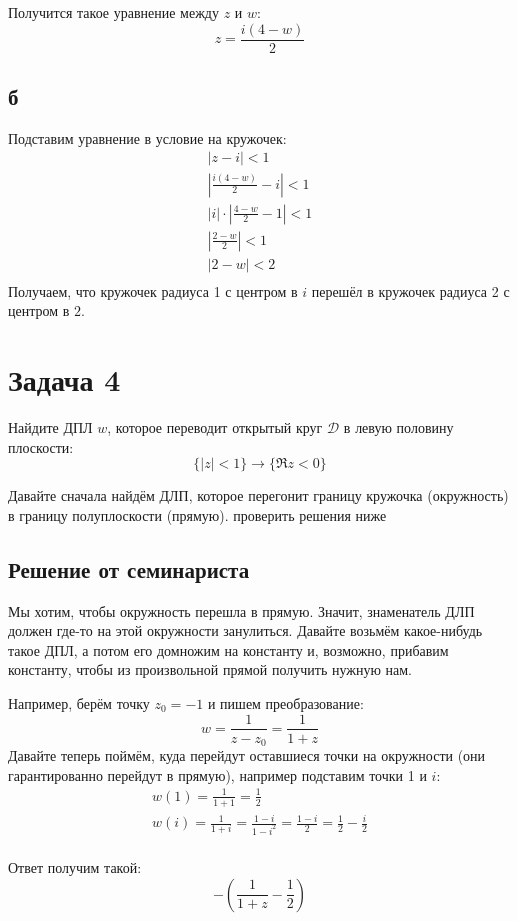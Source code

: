 		Получится такое уравнение между $z$ и $w$:
		\[
			z = \frac{i(4-w)}{2}
		\]

	\subsection{б}
		Подставим уравнение в условие на кружочек:
		\begin{gather*}
			|z - i| < 1 \\
			\left|\frac{i(4-w)}{2} - i\right| < 1\\
			|i|\cdot\left|\frac{4-w}{2} - 1\right| < 1\\
			\left|\frac{2-w}{2}\right| < 1\\
			|2-w| < 2\\
		\end{gather*}
		Получаем, что кружочек радиуса 1 с центром в $i$ перешёл в кружочек радиуса 2 с центром в $2$.

\section{Задача 4}
	Найдите ДПЛ $w$, которое переводит открытый круг $\mathcal{D}$ в левую половину плоскости:
	\[
		\{ |z| < 1 \} \to \{ \Re z < 0 \}
	\]

	Давайте сначала найдём ДЛП, которое перегонит границу кружочка (окружность) в границу полуплоскости (прямую).
	\TODO проверить решения ниже
	\subsection{Решение от семинариста}
		Мы хотим, чтобы окружность перешла в прямую.
		Значит, знаменатель ДЛП должен где-то на этой окружности занулиться.
		Давайте возьмём какое-нибудь такое ДПЛ, а потом его домножим на константу и, возможно, прибавим константу,
		чтобы из произвольной прямой получить нужную нам.

		Например, берём точку $z_0=-1$ и пишем преобразование:
		\[ w = \frac{1}{z-z_0} = \frac{1}{1+z} \]
		Давайте теперь поймём, куда перейдут оставшиеся точки на окружности (они гарантированно
		перейдут в прямую), например подставим точки 1 и $i$:
		\begin{gather*}
			w(1) = \frac{1}{1+1} = \frac 1 2\\
			w(i) = \frac{1}{1+i} = \frac{1-i}{1-i^2}=\frac{1-i}{2}=\frac12-\frac{i}{2}\\
		\end{gather*}

		Ответ получим такой:
		\[ -\left(\frac{1}{1+z}-\frac12\right) \]

